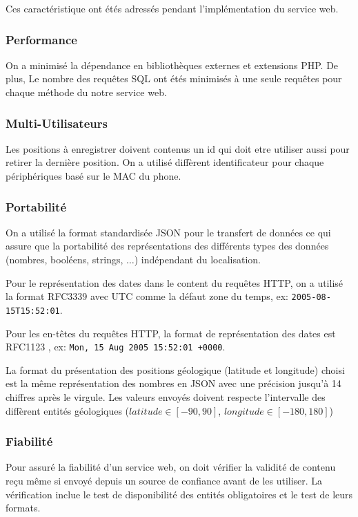 Ces caractéristique ont étés adressés pendant l'implémentation du service web.

\subsubsection{Performance}

On a minimisé la dépendance en bibliothèques externes et extensions PHP.
De plus, Le nombre des requêtes SQL ont étés minimisés à une seule requêtes pour
chaque méthode du notre service web.

\subsubsection{Multi-Utilisateurs}

Les positions à enregistrer doivent contenus un id qui doit etre utiliser aussi
pour retirer la dernière position.
On a utilisé diffèrent identificateur pour chaque périphériques basé sur le MAC
du phone.

\subsubsection{Portabilité}

On a utilisé la format standardisée JSON pour le transfert de données ce qui
assure que la portabilité des représentations des différents types des données
(nombres, booléens, strings, $\dotsc$) indépendant du localisation.

Pour le représentation des dates dans le content du requêtes HTTP, on a utilisé
la format RFC3339 \cite{RFC3339} avec UTC comme la défaut zone du temps, ex:
\verb|2005-08-15T15:52:01|.

Pour les en-têtes du requêtes HTTP, la format de représentation des dates est
RFC1123 \cite{RFC1123}, ex: \verb|Mon, 15 Aug 2005 15:52:01 +0000|.

La format du présentation des positions géologique (latitude et longitude)
choisi est la même représentation des nombres en JSON avec une précision jusqu'à
14 chiffres après le virgule. Les valeurs envoyés doivent respecte l'intervalle
des diffèrent entités géologiques ($latitude \in [-90, 90]$,
$longitude \in [-180, 180]$)

\subsubsection{Fiabilité}

Pour assuré la fiabilité d'un service web, on doit vérifier la validité de
contenu reçu même si envoyé depuis un source de confiance avant de les
utiliser. La vérification inclue le test de disponibilité des entités
obligatoires et le test de leurs formats.

